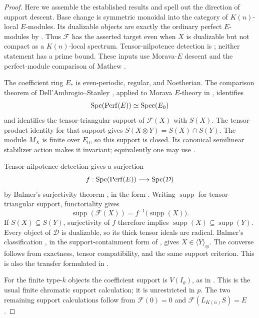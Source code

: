 \begin{proof}
Here we assemble the established results and spell out the direction
of support descent.
Base change is symmetric monoidal into the category of
\(K(n)\)-local \(E\)-modules.  Its dualizable objects are exactly
the ordinary perfect \(E\)-modules by
\cite[Proposition~4.7]{BHN22}.  Thus \(\mathcal F\) has the asserted
target even when \(X\) is dualizable but not compact as a
\(K(n)\)-local spectrum.  Tensor-nilpotence detection is
\cite[Proposition~4.6]{BHN22}; neither statement has a prime bound.
These inputs use Morava-\(E\) descent and the perfect-module comparison
of Mathew \cite[Propositions~3.27 and~10.10--10.11]{Mathew16}.

The coefficient ring \(E_*\) is even-periodic, regular, and
Noetherian.  The comparison theorem of Dell'Ambrogio--Stanley
\cite[Theorem~1.1 and Lemma~3.10]{DellAmbrogioStanley16}, applied to
Morava \(E\)-theory in \cite[Lemmas~4.3--4.4]{BHN22}, identifies
\[
  \operatorname{Spc}(\operatorname{Perf}(E))\simeq\operatorname{Spec}(E_0)
\]
and identifies the tensor-triangular support of \(\mathcal F(X)\)
with \(S(X)\).  The tensor-product identity for that support gives
\(S(X\otimes Y)=S(X)\cap S(Y)\).
The module \(M_X\) is finite over \(E_0\), so this
support is closed.  Its canonical semilinear stabilizer action makes
it invariant; equivalently one may use
\cite[Lemma~4.5]{BHN22}.

Tensor-nilpotence detection gives a surjection
\[
 f:\operatorname{Spc}(\operatorname{Perf}(E))\longrightarrow\operatorname{Spc}(\mathcal D)
\]
by Balmer's surjectivity theorem \cite[Theorem~1.3]{Balmer18},
in the form \cite[Theorem~2.6 and Corollary~4.8]{BHN22}.
Writing \(\operatorname{supp}\) for tensor-triangular support,
functoriality gives
\[
 \operatorname{supp}(\mathcal F(X))
       =f^{-1}\bigl(\operatorname{supp}(X)\bigr).
\]
If \(S(X)\subseteq S(Y)\), surjectivity of \(f\) therefore implies
\(\operatorname{supp}(X)\subseteq\operatorname{supp}(Y)\).
Every object of \(\mathcal D\) is dualizable, so its thick tensor
ideals are radical.  Balmer's classification
\cite[Theorem~4.10]{Balmer05}, in the support-containment form of
\cite[Corollary~2.4]{BHN22}, gives
\(X\in\langle Y\rangle_\otimes\).
The converse follows from exactness, tensor compatibility, and the
same support criterion.  This is also the transfer formulated in
\cite[Corollary~2.7]{BHN22}.

For the finite type-\(k\) objects the coefficient support is
\(V(I_k)\), as in
\cite[Proposition~3.3 and the proof of Theorem~4.9]{BHN22}.
This is the usual finite chromatic support calculation; it is
unrestricted in \(p\).
The two remaining support calculations follow from
\(\mathcal F(0)=0\) and \(\mathcal F(L_{K(n)}S)=E\).
\end{proof}

